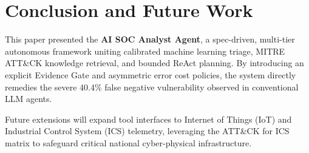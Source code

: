 \section{Conclusion and Future Work}
This paper presented the \textbf{AI SOC Analyst Agent}, a spec-driven, multi-tier autonomous framework uniting calibrated machine learning triage, MITRE ATT\&CK knowledge retrieval, and bounded ReAct planning. By introducing an explicit Evidence Gate and asymmetric error cost policies, the system directly remedies the severe 40.4\% false negative vulnerability observed in conventional LLM agents. 

Future extensions will expand tool interfaces to Internet of Things (IoT) and Industrial Control System (ICS) telemetry, leveraging the ATT\&CK for ICS matrix to safeguard critical national cyber-physical infrastructure.
